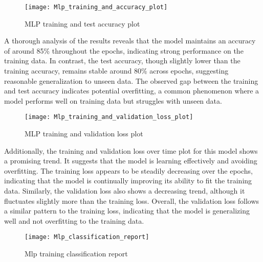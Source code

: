 \documentclass[
	article, %
	11pt, %
]{CSUniSchoolLabReport}
\begin{document}
\begin{figure}[H] 
	\centering
	\texttt{[image: Mlp\_training\_and\_accuracy\_plot]}
	\caption{MLP training and test accuracy plot}\label{fig:mlp_training_and_accuracy_plot}
\end{figure}

A thorough analysis of the results reveals that the model maintains an accuracy of around 85\% throughout the epochs, indicating strong performance on the training data. In contrast, the test accuracy, though slightly lower than the training accuracy, remains stable around 80\% across epochs, suggesting reasonable generalization to unseen data. The observed gap between the training and test accuracy indicates potential overfitting, a common phenomenon where a model performs well on training data but struggles with unseen data.

\begin{figure}[H] 
	\centering
	\texttt{[image: Mlp\_training\_and\_validation\_loss\_plot]}
	\caption{MLP training and validation loss plot}\label{fig:mlp_training_and_validation_loss_plot}
\end{figure}

Additionally, the training and validation loss over time plot for this model shows a promising trend. It suggests that the model is learning effectively and avoiding overfitting. The training loss appears to be steadily decreasing over the epochs, indicating that the model is continually improving its ability to fit the training data. Similarly, the validation loss also shows a decreasing trend, although it fluctuates slightly more than the training loss. Overall, the validation loss follows a similar pattern to the training loss, indicating that the model is generalizing well and not overfitting to the training data.

\begin{figure}[H] 
	\centering
	\texttt{[image: Mlp\_classification\_report]}
	\caption{Mlp training classification report}\label{fig:mlp_classification_report}
\end{figure}
\end{document}
